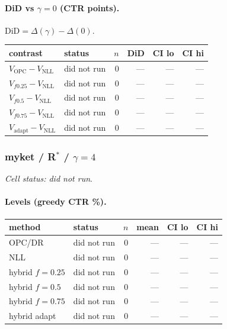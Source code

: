 \documentclass[10pt,a4paper]{article}
\begin{document}
\paragraph{DiD vs $\gamma=0$ (CTR points).} $\mathrm{DiD}=\Delta(\gamma)-\Delta(0)$.
{\centering\small\begin{tabular}{llrrrr}
\toprule contrast & status & $n$ & DiD & CI lo & CI hi \\
\midrule
$V_{\mathrm{OPC}}-V_{\mathrm{NLL}}$ & did not run & 0 & --- & --- & --- \\
$V_{f0.25}-V_{\mathrm{NLL}}$ & did not run & 0 & --- & --- & --- \\
$V_{f0.5}-V_{\mathrm{NLL}}$ & did not run & 0 & --- & --- & --- \\
$V_{f0.75}-V_{\mathrm{NLL}}$ & did not run & 0 & --- & --- & --- \\
$V_{\mathrm{adapt}}-V_{\mathrm{NLL}}$ & did not run & 0 & --- & --- & --- \\
\bottomrule\end{tabular}\par}
\bigskip
\subsubsection{myket / R$^*$ / $\gamma=4$}
\emph{Cell status: did not run}.
\paragraph{Levels (greedy CTR \%).}
{\centering\small\begin{tabular}{llrrrr}
\toprule method & status & $n$ & mean & CI lo & CI hi \\
\midrule
OPC/DR & did not run & 0 & --- & --- & --- \\
NLL & did not run & 0 & --- & --- & --- \\
hybrid $f{=}0.25$ & did not run & 0 & --- & --- & --- \\
hybrid $f{=}0.5$ & did not run & 0 & --- & --- & --- \\
hybrid $f{=}0.75$ & did not run & 0 & --- & --- & --- \\
hybrid adapt & did not run & 0 & --- & --- & --- \\
\bottomrule\end{tabular}\par}
\end{document}
